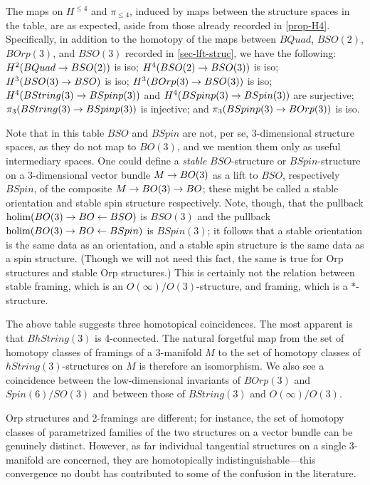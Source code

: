 \documentclass{amsart}
\begin{document}
The maps on $H^{\leq 4}$ and $\pi_{\leq 4}$, induced by maps between the structure spaces in the table, are as expected, aside from those already recorded in \cref{prop-H4}.  Specifically, in addition to the homotopy of the maps between $BQuad$, $BSO(2)$, $BOrp(3)$, and $BSO(3)$ recorded in \cref{sec-lft-struc}, we have the following: $H^2(BQuad \rightarrow BSO(2))$ is iso; $H^4(BSO(2) \rightarrow BSO(3))$ is iso; $H^3(BSO(3) \rightarrow BSO)$ is iso; $H^3(BOrp(3) \rightarrow BSO(3))$ is iso; $H^4(BString(3) \rightarrow BSpinp(3))$ and $H^4(BSpinp(3) \rightarrow BSpin(3))$ are surjective; $\pi_3(BString(3) \rightarrow BSpinp(3))$ is injective; and $\pi_3(BSpinp(3) \rightarrow BOrp(3))$ is iso. %

Note that in this table $BSO$ and $BSpin$ are not, per se, 3-dimensional structure spaces, as they do not map to $BO(3)$, and we mention them only as useful intermediary spaces.  One could define a \emph{stable} $BSO$-structure or $BSpin$-structure on a 3-dimensional vector bundle $M \rightarrow BO(3)$ as a lift to $BSO$, respectively $BSpin$, of the composite $M \rightarrow BO(3) \rightarrow BO$; these might be called a stable orientation and stable spin structure respectively.  Note, though, that the pullback $\operatorname{holim}(BO(3) \rightarrow BO \leftarrow BSO)$ is $BSO(3)$ and the pullback $\operatorname{holim}(BO(3) \rightarrow BO \leftarrow BSpin)$ is $BSpin(3)$; it follows that a stable orientation is the same data as an orientation, and a stable spin structure is the same data as a spin structure.  (Though we will not need this fact, the same is true for Orp structures and stable Orp structures.)  This is certainly not the relation between stable framing, which is an $O(\infty)/O(3)$-structure, and framing, which is a $*$-structure.

The above table suggests three homotopical coincidences.  The most apparent is that $BhString(3)$ is 4-connected.  The natural forgetful map from the set of homotopy classes of framings of a 3-manifold $M$ to the set of homotopy classes of $hString(3)$-structures on $M$ is therefore an isomorphism.  We also see a coincidence between the low-dimensional invariants of $BOrp(3)$ and $Spin(6)/SO(3)$ and between those of $BString(3)$ and $O(\infty)/O(3)$.

Orp structures and 2-framings are different; for instance, the set of homotopy classes of parametrized families of the two structures on a vector bundle can be genuinely distinct.  However, as far individual tangential structures on a single 3-manifold are concerned, they are homotopically indistinguishable---this convergence no doubt has contributed to some of the confusion in the literature.
\end{document}

